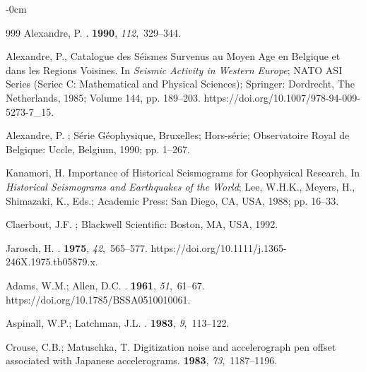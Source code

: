 \documentclass[sensors,article,accept,moreauthors,pdftex]{Definitions/mdpi}
\begin{document}
\begin{adjustwidth}{-\extralength}{0cm}
\begin{thebibliography}{999}
Alexandre, P.
.
 {\bf 1990}, {\em 112},~329--344.

Alexandre, P., Catalogue des Séismes Survenus au Moyen Age en Belgique et dans
  les Regions Voisines.
\newblock In {\em Seismic Activity in Western Europe}; NATO ASI Series (Seriec C: Mathematical
  and Physical Sciences); Springer: Dordrecht,
  The Netherlands,  1985; Volume 144, pp. 189--203.
\newblock
 {https://doi.org/10.1007/978-94-009-5273-7\_15}.

Alexandre, P.
; Série Géophysique, Bruxelles; Hors-série;
\newblock Observatoire Royal de Belgique: Uccle, Belgium,  %
1990; pp. 1--267.

Kanamori, H.
\newblock Importance of Historical Seismograms for Geophysical Research. In
  {\em Historical Seismograms and Earthquakes of the World}; Lee, W.H.K.,
  Meyers, H., Shimazaki, K., Eds.; Academic Press: San Diego, CA, USA,  1988; pp.
  16--33.

Claerbout, J.F.
;
  Blackwell Scientific: Boston, MA, USA,  1992.

Jarosch, H.
.
 {\bf 1975}, {\em
  42},~565--577.
\newblock
{https://doi.org/10.1111/j.1365-246X.1975.tb05879.x}.

Adams, W.M.; Allen, D.C.
.
 {\bf 1961},
  {\em 51},~61--67.
\newblock
{https://doi.org/10.1785/BSSA0510010061}.

Aspinall, W.P.; Latchman, J.L.
.
 {\bf 1983}, {\em 9},~113--122.

Crouse, C.B.; Matuschka, T.
\newblock Digitization noise and accelerograph pen offset associated with
  Japanese accelerograms.
 {\bf 1983},
  {\em 73},~1187--1196.


\end{thebibliography}
\end{adjustwidth}
\end{document}
